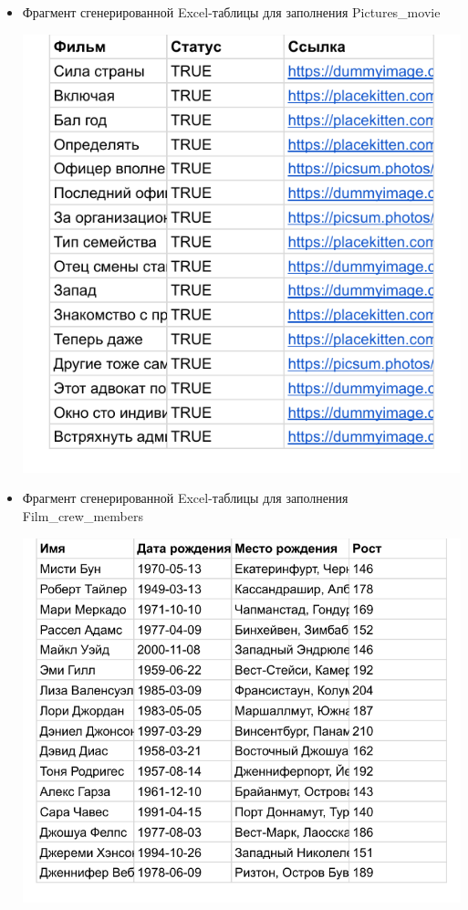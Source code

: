 \documentclass[a4paper,12pt]{article}
\renewcommand{\^}[2]{#1^{\, #2} \kern -1pt}
\newcommand{\1}{\kern 1pt}
\newcommand{\0}{\kern -1pt}
\begin{document}
\begin{itemize}
	\item Фрагмент сгенерированной Excel-таблицы для заполнения Pictures\_movie
	
	\includegraphics[scale=0.7,page=1]{movie_pictures_random.pdf}
	

	\item Фрагмент сгенерированной Excel-таблицы для заполнения Film\_crew\_members
	
	
	\includegraphics[scale=0.7,page=1]{members_random.pdf}
	


\end{itemize}
\end{document}
